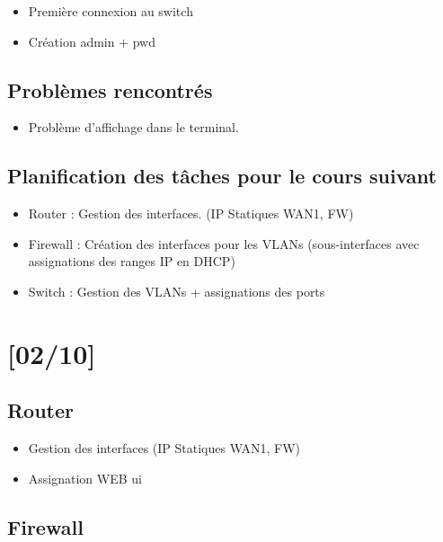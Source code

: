 \documentclass{article}
\begin{document}
\begin{itemize}
\item Première connexion au switch
\item Création admin + pwd
\end{itemize}


\subsection{Problèmes rencontrés}
\begin{itemize}
\item Problème d'affichage dans le terminal.
\end{itemize} 

\subsection{Planification des tâches pour le cours suivant}


\begin{itemize}
\item Router : Gestion des interfaces. (IP Statiques WAN1, FW)
\item Firewall : Création des interfaces pour les VLANs (sous-interfaces avec assignations des ranges IP en DHCP)
\item Switch : Gestion des VLANs + assignations des ports
\end{itemize} 



\newpage

\section{[02/10]}



\subsection{Router}

\begin{itemize}
\item Gestion des interfaces (IP Statiques WAN1, FW)
\item Assignation WEB ui
\end{itemize} 


\subsection{Firewall}
\end{document}
